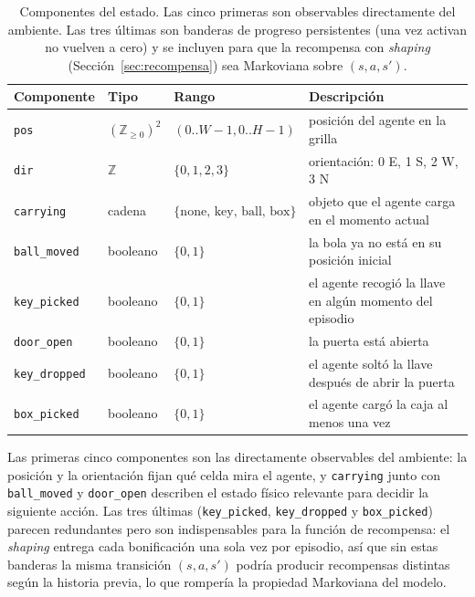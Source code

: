 \documentclass[11pt,a4paper]{article}
\begin{document}
\begin{table}[h]
  \centering
  \small
  \setlength{\extrarowheight}{2pt}
  \begin{tabularx}{\linewidth}{l l l X}
    \toprule
    \textbf{Componente} & \textbf{Tipo} & \textbf{Rango} & \textbf{Descripción} \\
    \midrule
    \texttt{pos}          & \((\mathbb{Z}_{\ge 0})^2\) & \((0..W{-}1, 0..H{-}1)\) & posición del agente en la grilla \\
    \texttt{dir}          & \(\mathbb{Z}\) & \(\{0,1,2,3\}\) & orientación: 0 E, 1 S, 2 W, 3 N \\
    \texttt{carrying}     & cadena & \(\{\text{none, key, ball, box}\}\) & objeto que el agente carga en el momento actual \\
    \texttt{ball\_moved}  & booleano & \(\{0,1\}\) & la bola ya no está en su posición inicial \\
    \texttt{key\_picked}  & booleano & \(\{0,1\}\) & el agente recogió la llave en algún momento del episodio \\
    \texttt{door\_open}   & booleano & \(\{0,1\}\) & la puerta está abierta \\
    \texttt{key\_dropped} & booleano & \(\{0,1\}\) & el agente soltó la llave después de abrir la puerta \\
    \texttt{box\_picked}  & booleano & \(\{0,1\}\) & el agente cargó la caja al menos una vez \\
    \bottomrule
  \end{tabularx}
  \caption{Componentes del estado. Las cinco primeras son observables
  directamente del ambiente. Las tres últimas son banderas de progreso
  persistentes (una vez activan no vuelven a cero) y se incluyen para
  que la recompensa con \emph{shaping} (Sección~\ref{sec:recompensa})
  sea Markoviana sobre \((s, a, s')\).}
  \label{tab:state}
\end{table}

Las primeras cinco componentes son las directamente observables del
ambiente: la posición y la orientación fijan qué celda mira el agente,
y \texttt{carrying} junto con \texttt{ball\_moved} y \texttt{door\_open}
describen el estado físico relevante para decidir la siguiente acción.
Las tres últimas (\texttt{key\_picked}, \texttt{key\_dropped} y
\texttt{box\_picked}) parecen redundantes pero son indispensables para
la función de recompensa: el \emph{shaping} entrega cada bonificación
una sola vez por episodio, así que sin estas banderas la misma
transición \((s, a, s')\) podría producir recompensas distintas según
la historia previa, lo que rompería la propiedad Markoviana del modelo.
\end{document}
